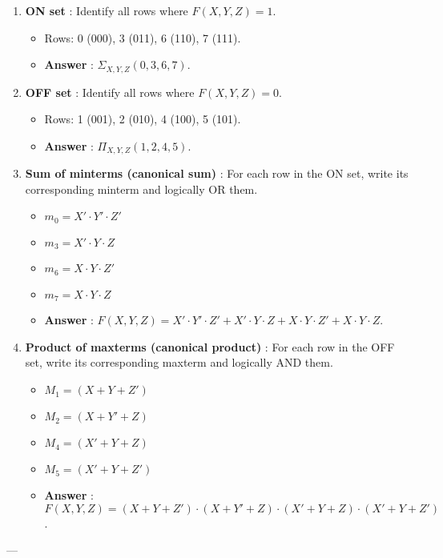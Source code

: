 \documentclass{article}
\begin{document}
\begin{itemize}
\begin{itemize}
        \begin{enumerate}
            \item \textbf{ON set} : Identify all rows where $F(X,Y,Z) = 1$.
            
                \begin{itemize}
                    \item Rows: 0 (000), 3 (011), 6 (110), 7 (111).
                    \item \textbf{Answer} : $\Sigma_{X,Y,Z}(0,3,6,7)$.
                \end{itemize}
            \item \textbf{OFF set} : Identify all rows where $F(X,Y,Z) = 0$.
            
                \begin{itemize}
                    \item Rows: 1 (001), 2 (010), 4 (100), 5 (101).
                    \item \textbf{Answer} : $\Pi_{X,Y,Z}(1,2,4,5)$.
                \end{itemize}
            \item \textbf{Sum of minterms (canonical sum)} : For each row in the ON set, write its corresponding minterm and logically OR them.
            
                \begin{itemize}
                    \item $m_0 = X' \cdot Y' \cdot Z'$
                    \item $m_3 = X' \cdot Y \cdot Z$
                    \item $m_6 = X \cdot Y \cdot Z'$
                    \item $m_7 = X \cdot Y \cdot Z$
                    \item \textbf{Answer} : $F(X,Y,Z) = X' \cdot Y' \cdot Z' + X' \cdot Y \cdot Z + X \cdot Y \cdot Z' + X \cdot Y \cdot Z$.
                \end{itemize}
            \item \textbf{Product of maxterms (canonical product)} : For each row in the OFF set, write its corresponding maxterm and logically AND them.
            
                \begin{itemize}
                    \item $M_1 = (X+Y+Z')$
                    \item $M_2 = (X+Y'+Z)$
                    \item $M_4 = (X'+Y+Z)$
                    \item $M_5 = (X'+Y+Z')$
                    \item \textbf{Answer} : $F(X,Y,Z) = (X+Y+Z') \cdot (X+Y'+Z) \cdot (X'+Y+Z) \cdot (X'+Y+Z')$.
                \end{itemize}
        \end{enumerate}
\end{itemize}
\end{itemize}
---
\end{document}
